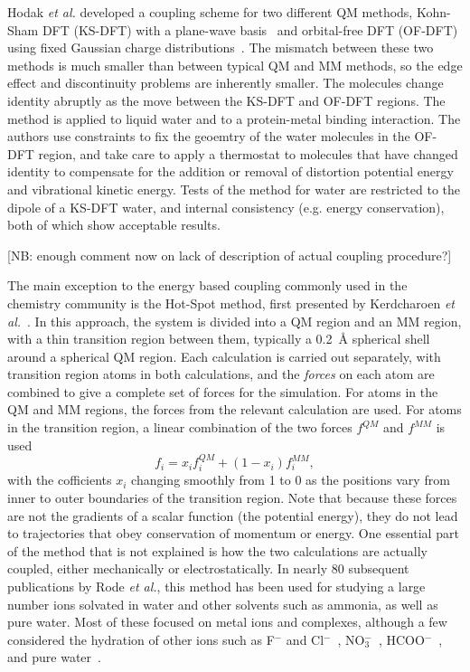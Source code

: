 \documentclass[11pt]{revtex4}
\begin{document}
Hodak {\it et al.} developed a coupling scheme for two different
QM methods, Kohn-Sham DFT (KS-DFT) with a plane-wave basis~\cite{kohn_phys_rev_1965a}
and orbital-free DFT (OF-DFT) using fixed Gaussian charge
distributions~\cite{hodak_j_chem_phys_2008a}.  The mismatch between
these two methods is much smaller than between typical QM and MM
methods, so the edge effect and discontinuity problems are inherently
smaller.  The molecules change identity abruptly as the move between
the KS-DFT and OF-DFT regions.  The method is applied to liquid
water and to a protein-metal binding interaction.  The authors use
constraints to fix the geoemtry of the water molecules in the OF-DFT
region, and take care to apply a thermostat to molecules that have
changed identity to compensate for the addition or removal of
distortion potential energy and vibrational kinetic energy.  Tests
of the method for water are restricted to the dipole of a KS-DFT
water, and internal consistency (e.g. energy conservation), both
of which show acceptable results.

[NB: enough comment now on lack of description of actual coupling procedure?]

The main exception to the energy based coupling commonly used in
the chemistry community is the Hot-Spot method, first presented by
Kerdcharoen {\it et al.}~\cite{kerdcharoen_chem_phys_1996a}.  In
this approach, the system is divided into a QM region and an MM
region, with a thin transition region between them, typically a
0.2~{\AA} spherical shell around a spherical QM region.  Each
calculation is carried out separately, with transition region atoms
in both calculations, and the {\em forces} on each atom are combined
to give a complete set of forces for the simulation.   For atoms
in the QM and MM regions, the forces from the relevant calculation are used.
For atoms in the transition region, a linear combination of the two
forces $f^{QM}$ and $f^{MM}$ is used
$$f_i = x_i f_i^{QM} + (1-x_i) f_i^{MM},$$
with the cofficients $x_i$ changing smoothly from 1 to 0
as the positions vary from inner to outer boundaries of the transition
region.  Note that because these forces are not the gradients of a scalar
function (the potential energy), they do not lead to trajectories that
obey conservation of momentum or energy.  One essential part of the method
that is not explained is how the two calculations are actually coupled,
either mechanically or electrostatically.  In
nearly 80 subsequent publications by Rode {\it et al.}, this method
has been used for studying a large number ions solvated in water
and other solvents such as ammonia, as well as pure water.  Most
of these focused on metal ions and complexes, although a few
considered the hydration of other ions such as F$^-$ and
Cl$^-$~\cite{tongraar_phys_chem_chem_phys_2003a,tongraar_chem_phys_lett_2005a},
NO$_3^-$~\cite{tongraar_j_phys_chem_a_2006a},
HCOO$^-$~\cite{payaka_j_phys_chem_a_2009a}, and pure
water~\cite{xenides_j_chem_phys_2005a,xenides_j_mol_liq_2006a}.
\end{document}
